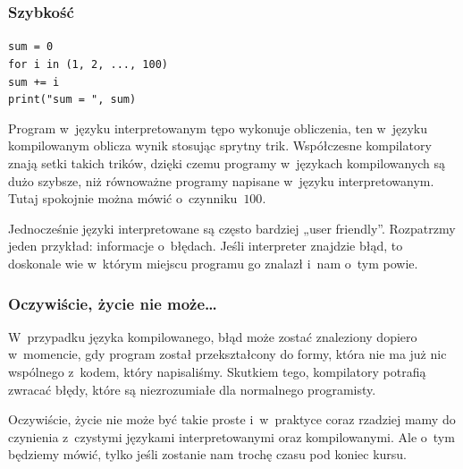 \documentclass[10pt,t]{beamer}
\begin{document}
\begin{frame}
  \frametitle{Szybkość}


  \texttt{sum = 0} \\

  \texttt{for i in (1, 2, ..., 100)} \\
  \hphantom{aaaa} \texttt{sum += i} \\

  \texttt{print("sum = ", sum)}

  Program w~języku interpretowanym tępo wykonuje obliczenia, ten
  w~języku kompilowanym oblicza wynik stosując sprytny trik. Współczesne
  kompilatory znają setki takich trików, dzięki czemu programy w~językach
  kompilowanych są \alert{dużo} szybsze, niż równoważne programy napisane
  w~języku interpretowanym. Tutaj spokojnie można mówić o~czynniku~$100$.

  Jednocześnie języki interpretowane są często bardziej „user friendly”.
  Rozpatrzmy jeden przykład: informacje o~błędach. Jeśli interpreter
  znajdzie błąd, to doskonale wie w~którym miejscu programu go znalazł
  i~nam o~tym powie.

\end{frame}





\begin{frame}
  \frametitle{Oczywiście, życie nie może\ldots}


  W~przypadku języka kompilowanego, błąd może zostać znaleziony dopiero
  w~momencie, gdy program został przekształcony do formy, która
  nie ma już nic wspólnego z~kodem, który napisaliśmy. Skutkiem tego,
  kompilatory potrafią zwracać błędy, które są niezrozumiałe dla normalnego
  programisty.

  Oczywiście, życie nie może być takie proste i~w~praktyce coraz rzadziej
  mamy do czynienia z~czystymi językami interpretowanymi oraz kompilowanymi.
  Ale o~tym będziemy mówić, tylko jeśli zostanie nam trochę czasu pod
  koniec kursu.

\end{frame}












\end{document}
